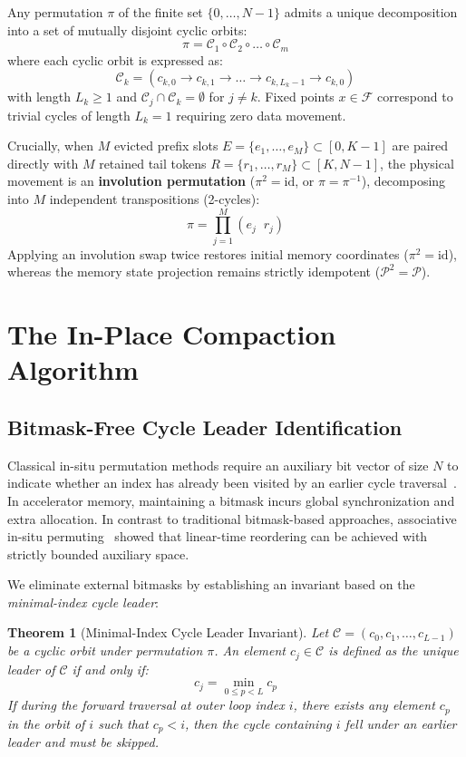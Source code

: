 \documentclass[journal,10pt,twocolumn]{article}
\newtheorem{theorem}{Theorem}
\begin{document}
Any permutation $\pi$ of the finite set $\{0, \dots, N-1\}$ admits a unique decomposition into a set of mutually disjoint cyclic orbits:
\begin{equation}
    \pi = \mathcal{C}_1 \circ \mathcal{C}_2 \circ \dots \circ \mathcal{C}_m
\end{equation}
where each cyclic orbit is expressed as:
\begin{equation}
    \mathcal{C}_k = (c_{k,0} \to c_{k,1} \to \dots \to c_{k,L_k-1} \to c_{k,0})
\end{equation}
with length $L_k \ge 1$ and $\mathcal{C}_j \cap \mathcal{C}_k = \emptyset$ for $j \ne k$. Fixed points $x \in \mathcal{F}$ correspond to trivial cycles of length $L_k = 1$ requiring zero data movement.

Crucially, when $M$ evicted prefix slots $E = \{e_1, \dots, e_M\} \subset [0, K-1]$ are paired directly with $M$ retained tail tokens $R = \{r_1, \dots, r_M\} \subset [K, N-1]$, the physical movement is an \textbf{involution permutation} ($\pi^2 = \text{id}$, or $\pi = \pi^{-1}$), decomposing into $M$ independent transpositions (2-cycles):
\begin{equation}
    \pi = \prod_{j=1}^M (e_j \;\; r_j)
\end{equation}
Applying an involution swap twice restores initial memory coordinates ($\pi^2 = \text{id}$), whereas the memory state projection remains strictly idempotent ($\mathcal{P}^2 = \mathcal{P}$).

\section{The In-Place Compaction Algorithm}
\label{sec:algorithm}

\subsection{Bitmask-Free Cycle Leader Identification}
Classical in-situ permutation methods require an auxiliary bit vector of size $N$ to indicate whether an index has already been visited by an earlier cycle traversal~\cite{knuth1998art}. In accelerator memory, maintaining a bitmask incurs global synchronization and extra allocation. In contrast to traditional bitmask-based approaches, associative in-situ permuting~\cite{cetin2013insitu, cetin2013inplace} showed that linear-time reordering can be achieved with strictly bounded auxiliary space.

We eliminate external bitmasks by establishing an invariant based on the \textit{minimal-index cycle leader}:
\begin{theorem}[Minimal-Index Cycle Leader Invariant]
Let $\mathcal{C} = (c_0, c_1, \dots, c_{L-1})$ be a cyclic orbit under permutation $\pi$. An element $c_j \in \mathcal{C}$ is defined as the unique leader of $\mathcal{C}$ if and only if:
\begin{equation}
    c_j = \min_{0 \le p < L} c_p
\end{equation}
If during the forward traversal at outer loop index $i$, there exists any element $c_p$ in the orbit of $i$ such that $c_p < i$, then the cycle containing $i$ fell under an earlier leader and must be skipped.
\end{theorem}
\end{document}
